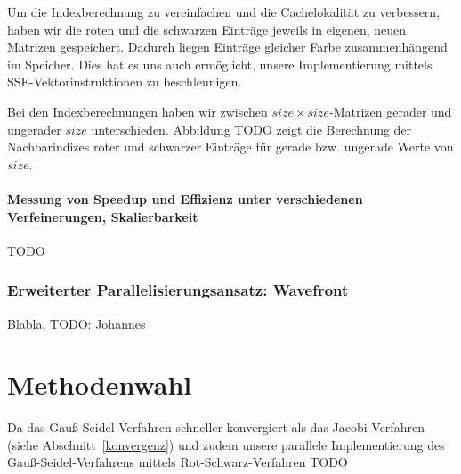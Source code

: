 \documentclass{article}
\begin{document}
Um die Indexberechnung zu vereinfachen und die Cachelokalität zu verbessern, haben wir die roten und die schwarzen Einträge jeweils in eigenen, neuen Matrizen gespeichert. Dadurch liegen Einträge gleicher Farbe zusammenhängend im Speicher. Dies hat es uns auch ermöglicht, unsere Implementierung mittels SSE-Vektorinstruktionen zu beschleunigen.

Bei den Indexberechnungen haben wir zwischen $size \times size$-Matrizen gerader und ungerader $size$ unterschieden. Abbildung TODO zeigt die Berechnung der Nachbarindizes roter und schwarzer Einträge für gerade bzw. ungerade Werte von $size$.


\paragraph{Messung von Speedup und Effizienz unter verschiedenen Verfeinerungen, Skalierbarkeit}
TODO

\subsubsection{Erweiterter Parallelisierungsansatz: Wavefront}
Blabla, TODO: Johannes

\section{Methodenwahl}
Da das Gauß-Seidel-Verfahren schneller konvergiert als das Jacobi-Verfahren (siehe Abschnitt~\ref{konvergenz}) und zudem unsere parallele Implementierung des Gauß-Seidel-Verfahrens mittels Rot-Schwarz-Verfahren TODO
\end{document}
